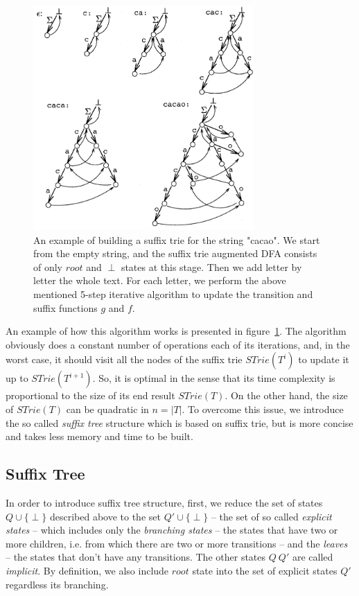 \documentclass[paper=a4, fontsize=11pt]{scrartcl} %
\numberwithin{equation}{section} %
\numberwithin{figure}{section} %
\numberwithin{table}{section} %
\begin{document}
\begin{figure}[h!]
\centering
\includegraphics[width=0.75\textwidth]{figures/suffix-trie-eg.png}
\caption{An example of building a suffix trie for the string "cacao". We start from the empty string, and the suffix trie augmented DFA consists of only $root$ and $\perp$ states at this stage. Then we add letter by letter the whole text. For each letter, we perform the above mentioned 5-step iterative algorithm to update the transition and suffix functions $g$ and $f$.}
\label{fig:siffix-trie}
\end{figure}

\par An example of how this algorithm works is presented in figure~\ref{fig:siffix-trie}. The algorithm obviously does a constant number of operations each of its iterations, and, in the worst case, it should visit all the nodes of the suffix trie $STrie(T^i)$ to update it up to $STrie(T^{i+1})$. So, it is optimal in the sense that its time complexity is proportional to the size of its end result $STrie(T)$. On the other hand, the size of $STrie(T)$ can be quadratic in $n = |T|$. To overcome this issue, we introduce the so called \textit{suffix tree} structure which is based on suffix trie, but is more concise and takes less memory and time to be built.

\subsection{Suffix Tree}
\par In order to introduce suffix tree structure, first, we reduce the set of states $Q \cup \{\perp\}$ described above to the set $Q' \cup \{\perp\}$ -- the set of so called \textit{explicit states} -- which includes only the \textit{branching states} -- the states that have two or more children, i.e. from which there are two or more transitions -- and the \textit{leaves} -- the states that don't have any transitions. The other states $Q \ Q'$ are called \textit{implicit}. By definition, we also include $root$ state into the set of explicit states $Q'$ regardless its branching.
\end{document}
